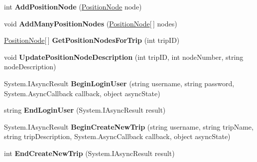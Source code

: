 \begin{DoxyCompactItemize}
\item 
\hypertarget{interface_i_trip_service_a1e18a8d9d2427b9794090e666bb549b2}{
int {\bfseries AddPositionNode} (\hyperlink{class_position_node}{PositionNode} node)}
\label{interface_i_trip_service_a1e18a8d9d2427b9794090e666bb549b2}

\item 
\hypertarget{interface_i_trip_service_a989bf5b377fd78dfd00917c9512eabec}{
void {\bfseries AddManyPositionNodes} (\hyperlink{class_position_node}{PositionNode}\mbox{[}$\,$\mbox{]} nodes)}
\label{interface_i_trip_service_a989bf5b377fd78dfd00917c9512eabec}

\item 
\hypertarget{interface_i_trip_service_aa28312fa4e26d384fefa7456ac8d7c59}{
\hyperlink{class_position_node}{PositionNode}\mbox{[}$\,$\mbox{]} {\bfseries GetPositionNodesForTrip} (int tripID)}
\label{interface_i_trip_service_aa28312fa4e26d384fefa7456ac8d7c59}

\item 
\hypertarget{interface_i_trip_service_a040f8ed636dd2f3e4a4fa059cfc9eada}{
void {\bfseries UpdatePositionNodeDescription} (int tripID, int nodeNumber, string nodeDescription)}
\label{interface_i_trip_service_a040f8ed636dd2f3e4a4fa059cfc9eada}

\item 
\hypertarget{interface_i_trip_service_a3cfbf7045ee856c9e0d1753f992cb53f}{
System.IAsyncResult {\bfseries BeginLoginUser} (string username, string password, System.AsyncCallback callback, object asyncState)}
\label{interface_i_trip_service_a3cfbf7045ee856c9e0d1753f992cb53f}

\item 
\hypertarget{interface_i_trip_service_a21f809101de7e9dada87257f2a8c7e0c}{
string {\bfseries EndLoginUser} (System.IAsyncResult result)}
\label{interface_i_trip_service_a21f809101de7e9dada87257f2a8c7e0c}

\item 
\hypertarget{interface_i_trip_service_ae3fabcd67ada0535675545b896783a1d}{
System.IAsyncResult {\bfseries BeginCreateNewTrip} (string username, string tripName, string tripDescription, System.AsyncCallback callback, object asyncState)}
\label{interface_i_trip_service_ae3fabcd67ada0535675545b896783a1d}

\item 
\hypertarget{interface_i_trip_service_a4ab63e3c4e872d664327bb05567a8f00}{
int {\bfseries EndCreateNewTrip} (System.IAsyncResult result)}
\label{interface_i_trip_service_a4ab63e3c4e872d664327bb05567a8f00}


\end{DoxyCompactItemize}
